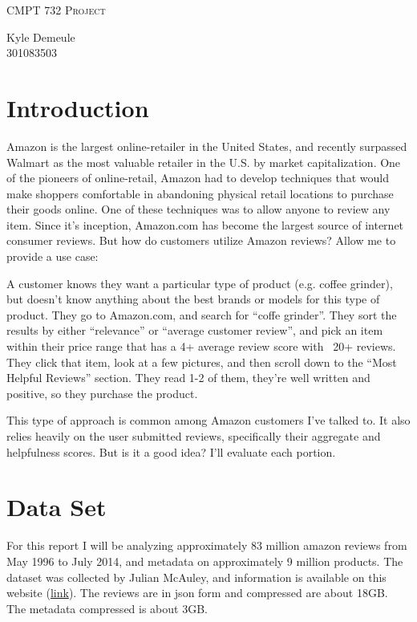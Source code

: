 \documentclass[a4paper,10pt]{article}
\begin{document}
\begin{titlepage}
    \centering
    {\scshape\LARGE CMPT 732 Project\par}
    \vspace{1cm}
    {\Large Kyle Demeule \\ 301083503\par}
\end{titlepage}

\section*{Introduction}
Amazon is the largest online-retailer in the United States, and recently surpassed Walmart as the most valuable retailer in the U.S. by market capitalization. One of the pioneers of online-retail, Amazon had to develop techniques that would make shoppers comfortable in abandoning physical retail locations to purchase their goods online. One of these techniques was to allow anyone to review any item. Since it's inception, Amazon.com has become the largest source of internet consumer reviews. But how do customers utilize Amazon reviews? Allow me to provide a use case:

A customer knows they want a particular type of product (e.g. coffee grinder), but doesn't know anything about the best brands or models for this type of product. They go to Amazon.com, and search for \enquote{coffe grinder}. They sort the results by either \enquote{relevance} or \enquote{average customer review}, and pick an item within their price range that has a 4+ average review score with ~20+ reviews. They click that item, look at a few pictures, and then scroll down to the \enquote{Most Helpful Reviews} section. They read 1-2 of them, they're well written and positive, so they purchase the product.

This type of approach is common among Amazon customers I've talked to. It also relies heavily on the user submitted reviews, specifically their aggregate and helpfulness scores. But is it a good idea? I'll evaluate each portion.

\section*{Data Set}
For this report I will be analyzing approximately 83 million amazon reviews from May 1996 to July 2014, and metadata on approximately 9 million products. The dataset was collected by Julian McAuley, and information is available on this website (\href{http://jmcauley.ucsd.edu/data/amazon/}{link}). The reviews are in json form and compressed are about 18GB. The metadata compressed is about 3GB.
\end{document}
